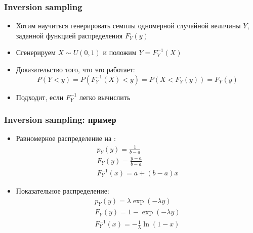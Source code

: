\documentclass[handout,10pt]{beamer}
\begin{document}
\begin{frame}[fragile]
\frametitle{Inversion sampling}
\begin{itemize}
\item Хотим научиться генерировать семплы одномерной случайной величины \begin{math}Y\end{math}, заданной функцией распределения \begin{math}F_Y(y)\end{math}
\pause
\item Сгенерируем \begin{math}X\sim U(0,1)\end{math} и положим \begin{math}Y = F_Y^{-1}(X)\end{math}
\pause
\item Доказательство того, что это работает:
\begin{equation*}
P(Y < y) = P(F_Y^{-1}(X) < y) = P(X < F_Y(y)) = F_Y(y)
\end{equation*}
\pause
\item Подходит, если \begin{math}F_Y^{-1}\end{math} легко вычислить
\end{itemize}
\end{frame}

\begin{frame}[fragile]
\frametitle{Inversion sampling: пример}
\begin{itemize}
\item Равномерное распределение на \begin{math}[a, b]\end{math}:
\begin{gather*}
p_Y(y) = \frac{1}{b-a} \\
F_Y(y) = \frac{y-a}{b-a} \\
F_Y^{-1}(x) = a + (b-a)x
\end{gather*}
\pause
\item Показательное распределение:
\begin{gather*}
p_Y(y) = \lambda\exp(-\lambda y) \\
F_Y(y) = 1 - \exp(-\lambda y) \\
F_Y^{-1}(x) = -\frac{1}{\lambda}\ln(1-x)
\end{gather*}
\end{itemize}
\end{frame}
\end{document}
